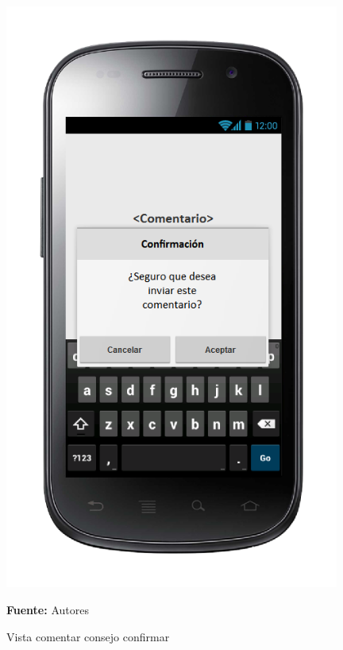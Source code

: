 \begin{figure}[!htb]
  \begin{center}
\includegraphics[width=11cm]{./imagenes/UI/Contenidos/comentar_consejo_confirmar.png}
    \caption{Vista comentar consejo confirmar}
    \label{fig:Vista_comentar_consejo_confirmar}
    \textbf{Fuente:}  Autores
  \end{center}
\end{figure}

